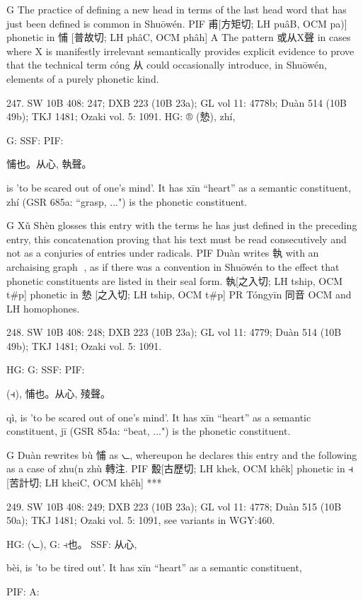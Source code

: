 G   The practice of defining a new head in terms of the last head word that has just been defined is common in Shuōwén.
PIF    甫[方矩切; LH puâB, OCM pa)] phonetic in 悑 [普故切; LH phâC, OCM phâh]
A The pattern 或从X聲 in cases where X is manifestly irrelevant semantically provides explicit evidence to prove that the technical term cóng 从 could occasionally introduce, in Shuōwén, elements of a purely phonetic kind.


247. SW 10B 408: 247; DXB 223 (10B 23a); GL vol 11: 4778b; Duàn 514 (10B 49b); TKJ 1481; Ozaki vol. 5: 1091.
HG:  ® (慹),   zhí,




G: SSF: PIF:

悑也。从心, 執聲。

is 'to be scared out of one's mind'.
It has xīn ``heart'' as a semantic constituent,
zhí (GSR 685a: ``grasp, ...") is the phonetic constituent.

G Xǔ Shèn glosses this entry with the terms he has just defined in the preceding entry, this concatenation proving that his text must be read consecutively and not as a conjuries of entries under radicals.
PIF Duàn writes 執 with an archaising graph ᠚, as if there was a convention in Shuōwén to the effect that phonetic constituents are listed in their seal form.
執[之入切; LH tship, OCM t\#p] phonetic in 慹 [之入切; LH tship, OCM t\#p]
PR   Tóngyīn 同音 OCM and LH homophones.

248. SW 10B 408: 248; DXB 223 (10B 23a); GL vol 11: 4779; Duàn 514 (10B 49b); TKJ 1481; Ozaki vol. 5: 1091.


HG:
G: SSF: PIF:

(⫞),
悑也。从心, 㱥聲。

qì,
is 'to be scared out of one's mind'.
It has xīn ``heart'' as a semantic constituent,
jī (GSR 854a: ``beat, ...") is the phonetic constituent.

G	Duàn rewrites bù 悑 as ⦦, whereupon he declares this entry and the following as a case of
zhu(n zhù 轉注.
PIF     毄[古歷切; LH khek, OCM khêk] phonetic in ⫞ [苦計切; LH kheiC, OCM khêh]
***

249. SW 10B 408: 249; DXB 223 (10B 23a); GL vol 11: 4778; Duàn 515 (10B 50a); TKJ 1481; Ozaki vol. 5: 1091, see
variants in WGY:460.


HG:	(⦦),
G:	⫞也。
SSF: 从心,

bèi,
is 'to be tired out'.
It has xīn ``heart'' as a semantic constituent,

PIF: A:

